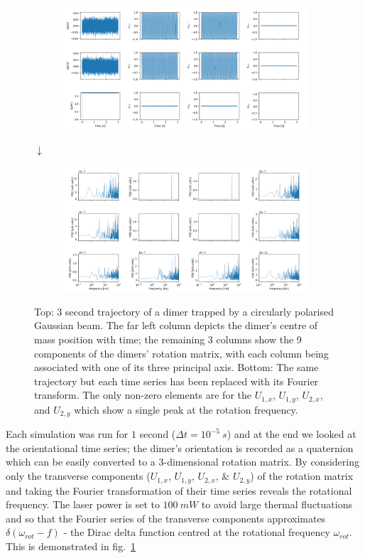 \begin{figure}[h!]
	\begin{subfigure}{\linewidth}
		\includegraphics[width=\linewidth]{rotating_traj.png}
	\end{subfigure}
	$\downarrow$
	\begin{subfigure}{\linewidth}
		\includegraphics[width=\linewidth]{rotating_traj_fourier.png}
	\end{subfigure}
	\caption{Top: 3 second trajectory of a dimer trapped by a 
		circularly polarised Gaussian beam. The far left 
		column depicts the dimer's centre of mass position 
		with time; the remaining 3 columns show the 9 components 
		of the dimers' rotation matrix, with each column being
		associated with one of its three principal axis. Bottom: 
		The same trajectory but each time series has been 
		replaced with its Fourier transform. The only non-zero 
		elements are for the $U_{1,x}$, $U_{1,y}$, $U_{2,x}$, 
		and $U_{2,y}$ which show a single peak at the rotation frequency.} 
	\label{fig:fourier_transform}
\end{figure}

Each simulation was run for $1$ second ($\Delta t =10^{-5}\ 
s$) and at the end we looked at the orientational time series; 
the dimer's orientation is recorded as a quaternion which can 
be easily converted to a 3-dimensional rotation matrix. 
By considering only the transverse components ($U_{1,x}$, 
$U_{1,y}$, $U_{2,x}$, \& $U_{2,y}$) of the rotation 
matrix and taking the Fourier transformation of their 
time series reveals the rotational frequency. The 
laser power is set to $100\ mW$ to avoid large thermal 
fluctuations and so that the Fourier series of the 
transverse components approximates $\delta(\omega_
{rot}-f)$ - the Dirac delta function centred at the 
rotational frequency $\omega_{rot}$. This is 
demonstrated in fig.~\ref{fig:fourier_transform}

